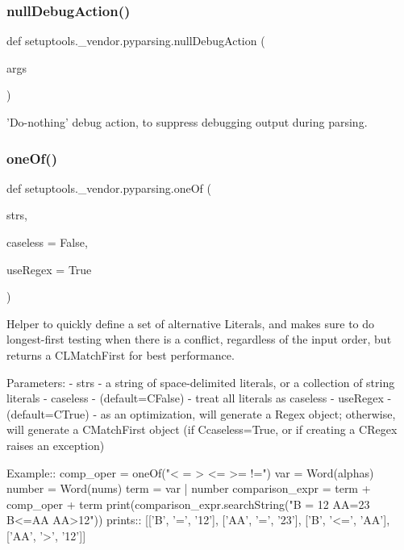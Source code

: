\subsubsection{\texorpdfstring{null\+Debug\+Action()}{nullDebugAction()}}
{\footnotesize\ttfamily def setuptools.\+\_\+vendor.\+pyparsing.\+null\+Debug\+Action (\begin{DoxyParamCaption}\item[{}]{args }\end{DoxyParamCaption})}

\begin{DoxyVerb}'Do-nothing' debug action, to suppress debugging output during parsing.\end{DoxyVerb}
 \mbox{\label{namespacesetuptools_1_1__vendor_1_1pyparsing_a13b417dc52bf215cec38c76be97ad862}} 
\subsubsection{\texorpdfstring{one\+Of()}{oneOf()}}
{\footnotesize\ttfamily def setuptools.\+\_\+vendor.\+pyparsing.\+one\+Of (\begin{DoxyParamCaption}\item[{}]{strs,  }\item[{}]{caseless = {\ttfamily False},  }\item[{}]{use\+Regex = {\ttfamily True} }\end{DoxyParamCaption})}

\begin{DoxyVerb}Helper to quickly define a set of alternative Literals, and makes sure to do
longest-first testing when there is a conflict, regardless of the input order,
but returns a C{L{MatchFirst}} for best performance.

Parameters:
 - strs - a string of space-delimited literals, or a collection of string literals
 - caseless - (default=C{False}) - treat all literals as caseless
 - useRegex - (default=C{True}) - as an optimization, will generate a Regex
      object; otherwise, will generate a C{MatchFirst} object (if C{caseless=True}, or
      if creating a C{Regex} raises an exception)

Example::
    comp_oper = oneOf("< = > <= >= !=")
    var = Word(alphas)
    number = Word(nums)
    term = var | number
    comparison_expr = term + comp_oper + term
    print(comparison_expr.searchString("B = 12  AA=23 B<=AA AA>12"))
prints::
    [['B', '=', '12'], ['AA', '=', '23'], ['B', '<=', 'AA'], ['AA', '>', '12']]
\end{DoxyVerb}
 \mbox{\label{namespacesetuptools_1_1__vendor_1_1pyparsing_addf8c0cb0b6a64f194b3c9e8ad564c8b}} 
